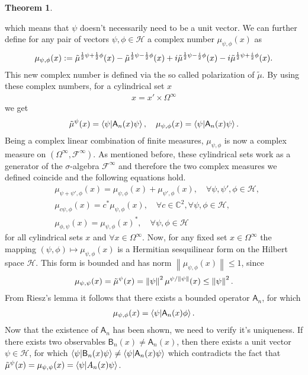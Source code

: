 \documentclass[a4paper,12pt]{wihuri}
\theoremstyle{definition}
\newtheorem{theorem}{Theorem}
\numberwithin{definition}{section}
\numberwithin{example}{section}
\numberwithin{theorem}{section}
\numberwithin{proposition}{section}
\numberwithin{lemma}{section}
\newcommand{\hi}{\mathcal{H}}%
\newcommand{\salg}{\mathcal{F}}%
\newcommand{\A}{\mathsf{A}}%
\newcommand{\B}{\mathsf{B}}%
\newcommand{\cc}{\mathbb{C}^2}%
\newcommand{\norm}[1]{\left\lVert#1\right\rVert}
\begin{document}
\begin{theorem}
\begin{center}
\end{center}
which means that $\psi$ doesn't necessarily need to be a unit vector. We can further define for any pair of vectors $\psi, \phi \in \hi$ a complex number $\mu_{\psi,\phi}(x)$ as
\begin{align*}
\mu_{\psi,\phi}(x) := \tilde{\mu}^{\frac{1}{2}\psi + \frac{1}{2}\phi}(x) - \tilde{\mu}^{\frac{1}{2}\psi - \frac{1}{2}\phi}(x) + i\tilde{\mu}^{\frac{1}{2}\psi - \frac{i}{2}\phi}(x) - i\tilde{\mu}^{\frac{1}{2}\psi + \frac{i}{2}\phi}(x)\text.
\end{align*}
This new complex number is defined via the so called polarization of $\tilde{\mu}$. By using these complex numbers, for a cylindrical set $x$
\begin{align*}
x = x' \times \Omega^\infty
\end{align*}
we get
\begin{align*}
\tilde{\mu}^\psi(x) = \braket{\psi|\A_n(x)\psi},\quad \mu_{\psi, \phi}(x) = \braket{\psi | \A_n(x)\psi}\text.
\end{align*}
Being a complex linear combination of finite measures, $\mu_{\psi,\phi}$ is now a complex measure on $(\Omega^\infty, \salg^\infty)$. As mentioned before, these cylindrical sets work as a generator of the $\sigma$-algebra $\salg^\infty$ and therefore the two complex measures we defined coincide and the following equations hold.
\begin{align*}
&\mu_{\psi + \psi', \phi}(x) = \mu_{\psi,\phi}(x) + \mu_{\psi',\phi}(x), \quad \forall \psi, \psi', \phi \in \hi, \\
&\mu_{c\psi, \phi}(x) = c^*\mu_{\psi,\phi}(x),\quad \forall c \in \cc,\forall \psi, \phi \in \hi, \\
&\mu_{\phi,\psi}(x) = \mu_{\psi,\phi}(x)^*,\quad \forall \psi, \phi \in \hi
\end{align*}
for all cylindrical sets $x$ and $\forall x \in \Omega^\infty$. Now, for any fixed set $x \in \Omega^\infty$ the mapping $(\psi, \phi) \mapsto \mu_{\psi,\phi}(x)$ is a Hermitian sesquilinear form on the Hilbert space $\hi$. This form is bounded and has norm $\norm{\mu_{\psi,\phi}(x)} \leq 1$, since
\begin{align*}
\mu_{\psi,\psi}(x) = \tilde{\mu}^\psi(x) = \norm{\psi}^2\mu^{\psi/\norm{\psi}}(x) \leq \norm{\psi}^2\text.
\end{align*}
From Riesz's lemma\cite{reed_simon_math_physics} it follows that there exists a bounded operator $\A_n$, for which
\begin{align*}
\mu_{\psi,\phi}(x) = \braket{\psi| \A_n(x)\phi}\text.
\end{align*}
Now that the existence of $\A_n$ has been shown, we need to verify it's uniqueness. If there exists two observables $\B_n(x) \neq \A_n(x)$, then there exists a unit vector $\psi \in \hi$, for which $\braket{\psi|\B_n(x)\psi} \neq \braket{\psi|\A_n(x)\psi}$ which contradicts the fact that $\tilde{\mu}^\psi(x) = \mu_{\psi,\psi}(x) = \braket{\psi|A_n(x)\psi}$.


\end{theorem}
\end{document}

